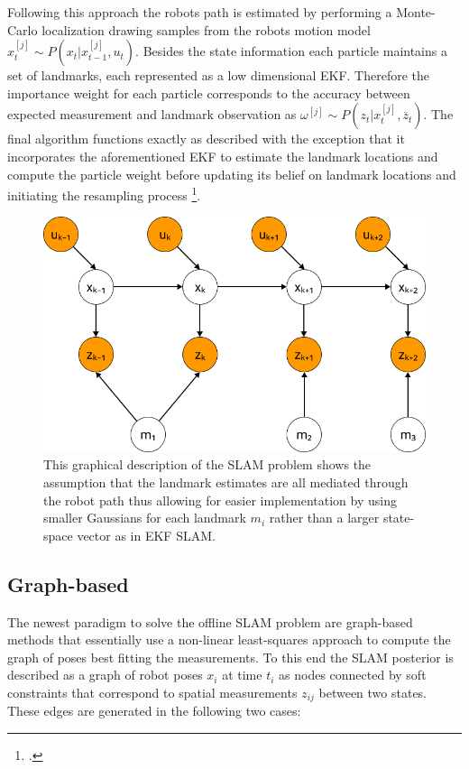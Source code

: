 Following this approach the robots path is estimated by performing a Monte-Carlo localization drawing samples from the robots motion model $x_{t}^{[j]} \sim P(x_{t} | x_{t-1}^{[j]}, u_{t}) $. Besides the state information each particle maintains a set of landmarks, each represented as a low dimensional EKF. Therefore the importance weight for each particle corresponds to the accuracy between expected measurement and landmark observation as $ \omega^{[j]} \sim P(z_{t} | x_{t}^{[j]}, \overline{z}_{t}) $.
The final algorithm functions exactly as described with the exception that it incorporates the aforementioned EKF to estimate the landmark locations and compute the particle weight before updating its belief on landmark locations and initiating the resampling process \footcite[Pages 1159-1162]{stachniss2016simultaneous}. 


\begin{figure}
	\centering
	\includegraphics[width=0.5\linewidth]{img/FastSlamGraphical}
	\caption{
		This graphical description of the SLAM problem shows the assumption that the landmark estimates are all mediated through the robot path thus allowing for easier implementation by using smaller Gaussians for each landmark $m_{i}$ rather than a larger state-space vector as in EKF SLAM.
	}
	\label{fig:fastSlamGraphical}
\end{figure}

\subsection{Graph-based}
The newest paradigm to solve the offline SLAM problem are graph-based methods that essentially use a non-linear least-squares approach to compute the graph of poses best fitting the measurements. 
To this end the SLAM posterior is described as a graph of robot poses $ x_{i} $ at time $ t_{i} $ as nodes connected by soft constraints that correspond to spatial measurements $z_{ij}$ between two states.
These edges are generated in the following two cases:

